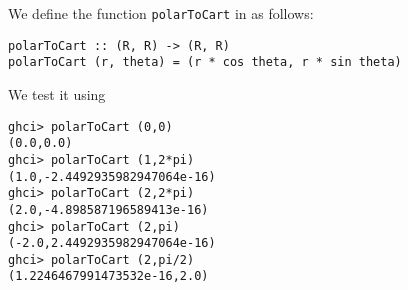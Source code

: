
We define the function \verb|polarToCart| in  as follows:

\scriptsize\begin{verbatim}
polarToCart :: (R, R) -> (R, R)
polarToCart (r, theta) = (r * cos theta, r * sin theta)
\end{verbatim}\normalsize

We test it using
\scriptsize\begin{verbatim}
ghci> polarToCart (0,0)
(0.0,0.0)
ghci> polarToCart (1,2*pi)
(1.0,-2.4492935982947064e-16)
ghci> polarToCart (2,2*pi)
(2.0,-4.898587196589413e-16)
ghci> polarToCart (2,pi)
(-2.0,2.4492935982947064e-16)
ghci> polarToCart (2,pi/2)
(1.2246467991473532e-16,2.0)
\end{verbatim}\normalsize
